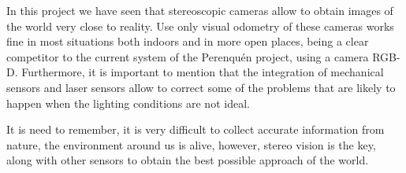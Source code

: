 

In this project we have seen that stereoscopic cameras allow to obtain images of
the world very close to reality. Use only visual odometry of these cameras works
fine in most situations both indoors and in more open places, being a clear
competitor to the current system of the Perenquén project, using a camera RGB-D.
Furthermore, it is important to mention that the integration of mechanical
sensors and laser sensors allow to correct some of the problems that are likely
to happen when the lighting conditions are not ideal.

It is need to remember, it is very difficult to collect accurate information
from nature, the environment around us is alive, however, stereo vision is the
key, along with other sensors to obtain the best possible approach of the world.

